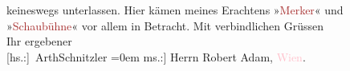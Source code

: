                keineswegs unterlassen. Hier kämen meines Erachtens »\textcolor{brown}{Merker}{}\ledrightnote{\textcolor{brown}{Der Merker}}« und »\textcolor{brown}{Schaubühne}{}\ledrightnote{\textcolor{brown}{Die Schaubühne / Die Weltbühne}}« vor allem in
               Betracht.\pend
           \pstart
           Mit verbindlichen Grüssen{\\[\baselineskip]}Ihr ergebener{\\[\baselineskip]}\spacefill\mbox{{[}hs.:{]} ArthSchnitzler}\pend
           \leftskip=0em{}\pstart
           \noindent{}{[}ms.:{]} Herrn Robert Adam, \textcolor{pink}{Wien}{}\ledrightnote{\textcolor{pink}{Wien}}.\pend
           \endnumbering{}  
      